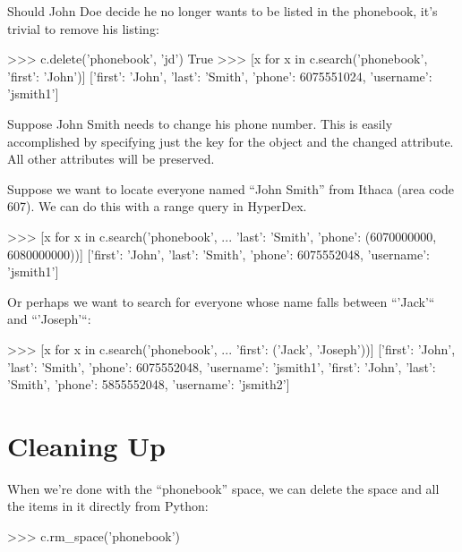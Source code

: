 Should John Doe decide he no longer wants to be listed in the phonebook, it's
trivial to remove his listing:

\begin{pythoncode}
>>> c.delete('phonebook', 'jd')
True
>>> [x for x in c.search('phonebook', {'first': 'John'})]
[{'first': 'John',
  'last': 'Smith',
  'phone': 6075551024,
  'username': 'jsmith1'}]
\end{pythoncode}

Suppose John Smith needs to change his phone number. This is easily accomplished
by specifying just the key for the object and the changed attribute.  All other
attributes will be preserved.


Suppose we want to locate everyone named ``John Smith'' from Ithaca (area code
607). We can do this with a range query in HyperDex.

\begin{pythoncode}
   >>> [x for x in c.search('phonebook',
   ...  {'last': 'Smith', 'phone': (6070000000, 6080000000)})]
   [{'first': 'John',
     'last': 'Smith',
     'phone': 6075552048,
     'username': 'jsmith1'}]
\end{pythoncode}

Or perhaps we want to search for everyone whose name falls between ``'Jack'``
and ``'Joseph'``:

\begin{pythoncode}
>>> [x for x in c.search('phonebook',
...  {'first': ('Jack', 'Joseph')})]
[{'first': 'John',
  'last': 'Smith',
  'phone': 6075552048,
  'username': 'jsmith1'},
 {'first': 'John',
  'last': 'Smith',
  'phone': 5855552048,
  'username': 'jsmith2'}]
\end{pythoncode}

\section{Cleaning Up}

When we're done with the ``phonebook'' space, we can delete the space and all
the items in it directly from Python:

\begin{pythoncode}
>>> c.rm_space('phonebook')
\end{pythoncode}
